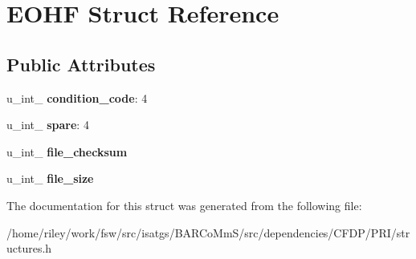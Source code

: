\hypertarget{struct_e_o_h_f}{}\section{E\+O\+HF Struct Reference}
\label{struct_e_o_h_f}
\subsection*{Public Attributes}
\begin{DoxyCompactItemize}
\item 
u\+\_\+int\+\_ {\bfseries condition\+\_\+code}\+: 4\hypertarget{struct_e_o_h_f_a3b24d8ff0a52b3b6273aa65d678c5fb6}{}\label{struct_e_o_h_f_a3b24d8ff0a52b3b6273aa65d678c5fb6}

\item 
u\+\_\+int\+\_ {\bfseries spare}\+: 4\hypertarget{struct_e_o_h_f_a53f9fbdb43acc5e06eba4582941a9626}{}\label{struct_e_o_h_f_a53f9fbdb43acc5e06eba4582941a9626}

\item 
u\+\_\+int\+\_ {\bfseries file\+\_\+checksum}\hypertarget{struct_e_o_h_f_aa69b44ed9e814c26f573e4868fd74cf4}{}\label{struct_e_o_h_f_aa69b44ed9e814c26f573e4868fd74cf4}

\item 
u\+\_\+int\+\_ {\bfseries file\+\_\+size}\hypertarget{struct_e_o_h_f_acf948090e886e58ab04d7bf3b66657af}{}\label{struct_e_o_h_f_acf948090e886e58ab04d7bf3b66657af}

\end{DoxyCompactItemize}


The documentation for this struct was generated from the following file\+:\begin{DoxyCompactItemize}
\item 
/home/riley/work/fsw/src/isatgs/\+B\+A\+R\+Co\+Mm\+S/src/dependencies/\+C\+F\+D\+P/\+P\+R\+I/structures.\+h\end{DoxyCompactItemize}
